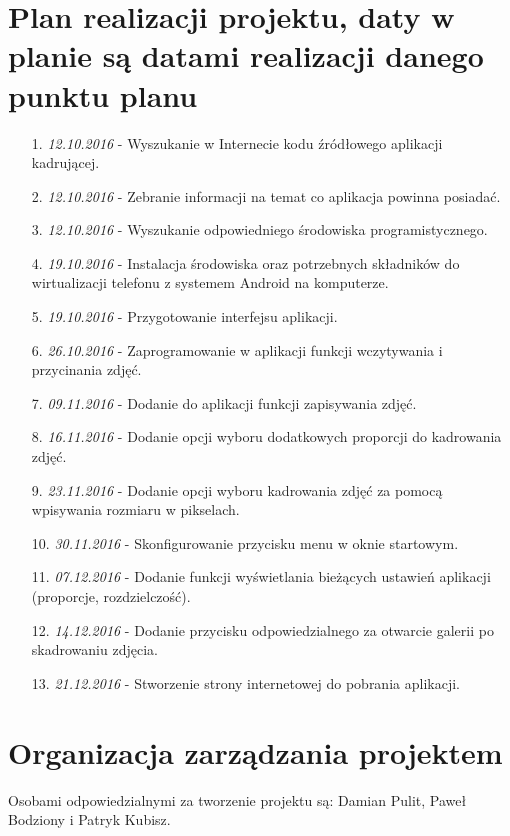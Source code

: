 \section{Plan realizacji projektu, daty w planie są datami realizacji danego punktu planu}
\begin{itemize} \itemsep1pt \parskip0pt 
\item [1.] \textit{12.10.2016} - Wyszukanie w Internecie kodu źródłowego aplikacji kadrującej.
\item [2.] \textit{12.10.2016} - Zebranie informacji na temat co aplikacja powinna posiadać.
\item [3.] \textit{12.10.2016} - Wyszukanie odpowiedniego środowiska programistycznego.
\item [4.] \textit{19.10.2016} - Instalacja środowiska oraz potrzebnych składników do wirtualizacji telefonu z systemem Android na komputerze. 
\item [5.] \textit{19.10.2016} - Przygotowanie interfejsu aplikacji.
\item [6.] \textit{26.10.2016} - Zaprogramowanie w aplikacji funkcji wczytywania i przycinania zdjęć.
\item [7.] \textit{09.11.2016} - Dodanie do aplikacji funkcji zapisywania zdjęć.
\item [8.] \textit{16.11.2016} - Dodanie opcji wyboru dodatkowych proporcji do kadrowania zdjęć.
\item [9.] \textit{23.11.2016} - Dodanie opcji wyboru kadrowania zdjęć za pomocą wpisywania rozmiaru w pikselach.
\item [10.] \textit{30.11.2016} - Skonfigurowanie przycisku menu w oknie startowym.
\item [11.] \textit{07.12.2016} - Dodanie funkcji wyświetlania bieżących ustawień aplikacji (proporcje, rozdzielczość).
\item [12.] \textit{14.12.2016} - Dodanie przycisku odpowiedzialnego za otwarcie galerii po skadrowaniu zdjęcia. 
\item [13.] \textit{21.12.2016} - Stworzenie strony internetowej do pobrania aplikacji. 
\end{itemize}

\section{Organizacja zarządzania projektem}
Osobami odpowiedzialnymi za tworzenie projektu są: Damian Pulit, Paweł \\ Bodziony i Patryk Kubisz. 

